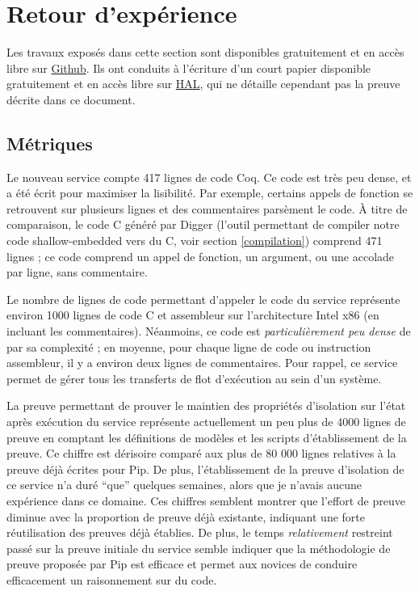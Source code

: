 			\newpage

	\section{Retour d'expérience}
	Les travaux exposés dans cette section sont disponibles gratuitement et en accès libre sur \href{https://github.com/2xs/pipcore}{Github}. Ils ont conduits à l'écriture d'un court papier disponible gratuitement et en accès libre sur \href{https://hal.archives-ouvertes.fr/hal-02347481}{HAL}, qui ne détaille cependant pas la preuve décrite dans ce document.

		\subsection{Métriques}

		Le nouveau service compte 417 lignes de code Coq. Ce code est très peu dense, et a été écrit pour maximiser la lisibilité. Par exemple, certains appels de fonction se retrouvent sur plusieurs lignes et des commentaires parsèment le code. À titre de comparaison, le code C généré par Digger (l'outil permettant de compiler notre code shallow-embedded vers du C, voir section \ref{compilation}) comprend 471 lignes ; ce code comprend un appel de fonction, un argument, ou une accolade par ligne, sans commentaire.

		Le nombre de lignes de code permettant d'appeler le code du service représente environ 1000 lignes de code C et assembleur sur l'architecture Intel x86 (en incluant les commentaires). Néanmoins, ce code est \emph{particulièrement peu dense} de par sa complexité ; en moyenne, pour chaque ligne de code ou instruction assembleur, il y a environ deux lignes de commentaires. 
		Pour rappel, ce service permet de gérer tous les transferts de flot d'exécution au sein d'un système. 

		La preuve permettant de prouver le maintien des propriétés d'isolation sur l'état après exécution du service représente actuellement un peu plus de 4000 lignes de preuve en comptant les définitions de modèles et les scripts d'établissement de la preuve. Ce chiffre est dérisoire comparé aux plus de 80 000 lignes relatives à la preuve déjà écrites pour Pip. De plus, l'établissement de la preuve d'isolation de ce service n'a duré ``que'' quelques semaines, alors que je n'avais aucune expérience dans ce domaine. Ces chiffres semblent montrer que l'effort de preuve diminue avec la proportion de preuve déjà existante, indiquant une forte réutilisation des preuves déjà établies. De plus, le temps \emph{relativement} restreint passé sur la preuve initiale du service semble indiquer que la méthodologie de preuve proposée par Pip est efficace et permet aux novices de conduire efficacement un raisonnement sur du code.

